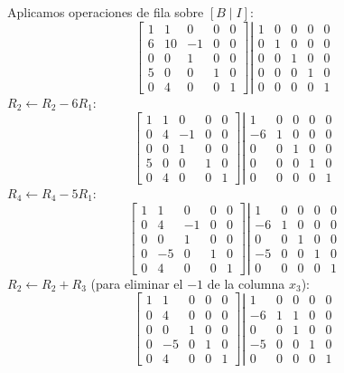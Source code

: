 \documentclass{article}
\begin{document}
\begin{enumerate}[a)]
Aplicamos operaciones de fila sobre $[B\mid I]$:
\[
\begin{bmatrix}1&1&0&0&0\\6&10&-1&0&0\\0&0&1&0&0\\5&0&0&1&0\\0&4&0&0&1\end{bmatrix}
\left|\begin{array}{ccccc}1&0&0&0&0\\0&1&0&0&0\\0&0&1&0&0\\0&0&0&1&0\\0&0&0&0&1\end{array}\right.
\]
$R_2\leftarrow R_2-6R_1$:
\[
\begin{bmatrix}1&1&0&0&0\\0&4&-1&0&0\\0&0&1&0&0\\5&0&0&1&0\\0&4&0&0&1\end{bmatrix}
\left|\begin{array}{ccccc}1&0&0&0&0\\-6&1&0&0&0\\0&0&1&0&0\\0&0&0&1&0\\0&0&0&0&1\end{array}\right.
\]
$R_4\leftarrow R_4-5R_1$:
\[
\begin{bmatrix}1&1&0&0&0\\0&4&-1&0&0\\0&0&1&0&0\\0&-5&0&1&0\\0&4&0&0&1\end{bmatrix}
\left|\begin{array}{ccccc}1&0&0&0&0\\-6&1&0&0&0\\0&0&1&0&0\\-5&0&0&1&0\\0&0&0&0&1\end{array}\right.
\]
$R_2\leftarrow R_2+R_3$ (para eliminar el $-1$ de la columna $x_3$):
\[
\begin{bmatrix}1&1&0&0&0\\0&4&0&0&0\\0&0&1&0&0\\0&-5&0&1&0\\0&4&0&0&1\end{bmatrix}
\left|\begin{array}{ccccc}1&0&0&0&0\\-6&1&1&0&0\\0&0&1&0&0\\-5&0&0&1&0\\0&0&0&0&1\end{array}\right.
\]
\end{enumerate}
\end{document}
